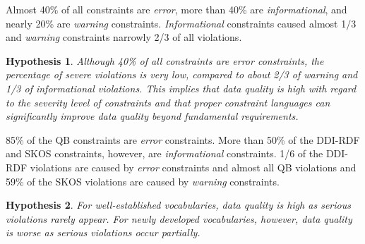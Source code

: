 \documentclass[conference]{IEEEtran}
\newtheorem{hyp}{Hypothesis}
\begin{document}

Almost 40\% of all constraints are \emph{error}, more than 40\% are \emph{informational}, and nearly 20\% are \emph{warning} constraints.
\emph{Informational} constraints caused almost 1/3 and
\emph{warning} constraints narrowly 2/3 of all violations.

\begin{hyp}
Although 40\% of all constraints are error constraints, the percentage of severe violations is very low, compared to about 2/3 of warning and 1/3 of informational violations. This implies that data quality is high with regard to the severity level of constraints and that proper constraint languages can significantly improve data quality beyond fundamental requirements.
\end{hyp} 

85\% of the QB constraints are \emph{error} constraints.
More than 50\% of the DDI-RDF and SKOS constraints, however, are \emph{informational} constraints.
1/6 of the DDI-RDF violations are caused by \emph{error} constraints and
almost all QB violations and 59\% of the SKOS violations are caused by \emph{warning} constraints.  
\begin{hyp}
For well-established vocabularies, data quality is high as serious violations rarely appear. For newly developed vocabularies, however, data quality is worse as serious violations occur partially.   
\end{hyp} 
\end{document}
